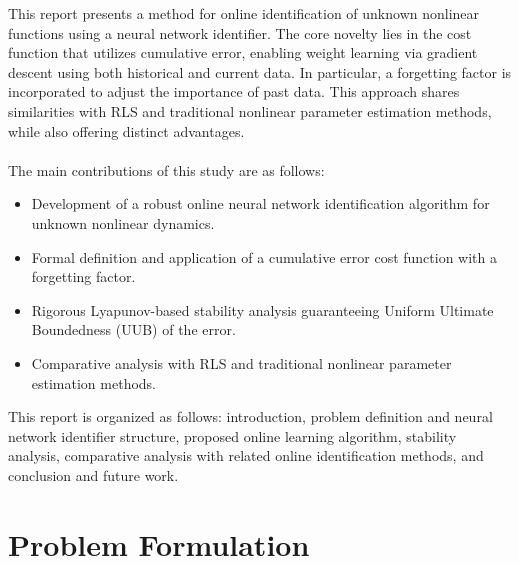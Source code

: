 \documentclass[10pt,twocolumn]{ICCAS}
\begin{document}
This report presents a method for online identification of unknown nonlinear functions using a neural network identifier. The core novelty lies in the cost function that utilizes cumulative error, enabling weight learning via gradient descent using both historical and current data. In particular, a forgetting factor is incorporated to adjust the importance of past data. This approach shares similarities with RLS and traditional nonlinear parameter estimation methods, while also offering distinct advantages.
\\ \\
The main contributions of this study are as follows:

\begin{itemize}
    \item Development of a robust online neural network identification algorithm for unknown nonlinear dynamics.
    \item Formal definition and application of a cumulative error cost function with a forgetting factor.
    \item Rigorous Lyapunov-based stability analysis guaranteeing Uniform Ultimate Boundedness (UUB) of the error.
    \item Comparative analysis with RLS and traditional nonlinear parameter estimation methods.
\end{itemize}

This report is organized as follows: introduction, problem definition and neural network identifier structure, proposed online learning algorithm, stability analysis, comparative analysis with related online identification methods, and conclusion and future work.

\section{Problem Formulation}
\end{document}
